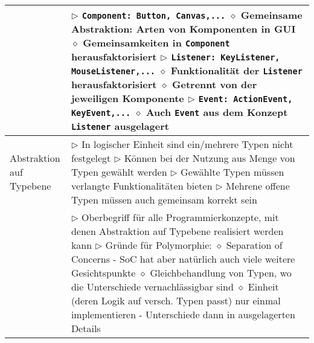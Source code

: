 \begin{longtable}{ | p{} p{} | }
	\makecell[l]{Beispiel Java} & \makecell[l]{
	$\rhd$ \texttt{Component: Button, Canvas,...} \\
	\hspace{0.4cm} $\diamond$ Gemeinsame Abstraktion: Arten von Komponenten in GUI \\
	\hspace{0.4cm} $\diamond$ Gemeinsamkeiten in \texttt{Component} herausfaktorisiert \\
	$\rhd$ \texttt{Listener: KeyListener, MouseListener,...} \\
	\hspace{0.4cm} $\diamond$ Funktionalität der \texttt{Listener} herausfaktorisiert \\
	\hspace{0.4cm} $\diamond$ Getrennt von der jeweiligen Komponente \\
	$\rhd$ \texttt{Event: ActionEvent, KeyEvent,...} \\
	\hspace{0.4cm} $\diamond$ Auch \texttt{Event} aus dem Konzept \texttt{Listener} ausgelagert } \\ \hline

	\makecell[l]{Abstraktion auf \\ Typebene} & \makecell[l]{
	$\rhd$ In logischer Einheit sind ein/mehrere Typen nicht festgelegt \\
	$\rhd$ Können bei der Nutzung aus Menge von Typen gewählt werden \\
	$\rhd$ Gewählte Typen müssen verlangte Funktionalitäten bieten \\
	$\rhd$ Mehrene offene Typen müssen auch gemeinsam korrekt sein} \\ \hline

	\makecell[l]{Polymorphie} & \makecell[l]{
	$\rhd$ Oberbegriff für alle Programmierkonzepte, mit denen Abstraktion auf \\
	\hspace{0.3cm} Typebene realisiert werden kann \\
	$\rhd$ Gründe für Polymorphie: \\
	\hspace{0.4cm} $\diamond$ Separation of Concerns \\
	\hspace{0.6cm} - SoC hat aber natürlich auch viele weitere Gesichtspunkte \\
	\hspace{0.4cm} $\diamond$ Gleichbehandlung von Typen, wo die Unterschiede vernachlässigbar sind \\
	\hspace{0.4cm} $\diamond$ Einheit (deren Logik auf versch. Typen passt) nur einmal implementieren \\
	\hspace{0.6cm} - Unterschiede dann in ausgelagerten Details} \\ \hline


\end{longtable}
